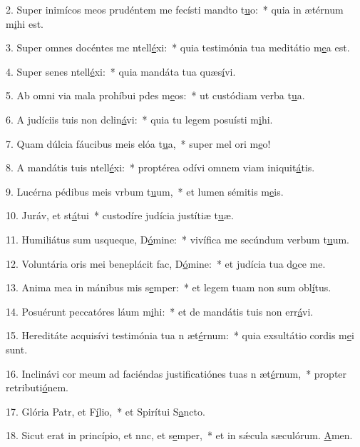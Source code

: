 2. Super inimícos meos prudéntem me fecísti mandto t\uline{u}o:~* quia in ætérnum m\uline{i}hi est.\par 
3. Super omnes docéntes me ntell\uline{é}xi:~* quia testimónia tua meditátio m\uline{e}a est.\par 
4. Super senes ntell\uline{é}xi:~* quia mandáta tua quæs\uline{í}vi.\par 
5. Ab omni via mala prohíbui pdes m\uline{e}os:~* ut custódiam verba t\uline{u}a.\par 
6. A judíciis tuis non dclin\uline{á}vi:~* quia tu legem posuísti m\uline{i}hi.\par 
7. Quam dúlcia fáucibus meis elóa t\uline{u}a,~* super mel ori m\uline{e}o!\par 
8. A mandátis tuis ntell\uline{é}xi:~* proptérea odívi omnem viam iniquit\uline{á}tis.\par 
9. Lucérna pédibus meis vrbum t\uline{u}um,~* et lumen sémitis m\uline{e}is.\par 
10. Juráv, et st\uline{á}tui~* custodíre judícia justítiæ t\uline{u}æ.\par 
11. Humiliátus sum usqueque, D\uline{ó}mine:~* vivífica me secúndum verbum t\uline{u}um.\par 
12. Voluntária oris mei beneplácit fac, D\uline{ó}mine:~* et judícia tua d\uline{o}ce me.\par 
13. Anima mea in mánibus mis s\uline{e}mper:~* et legem tuam non sum obl\uline{í}tus.\par 
14. Posuérunt peccatóres láum m\uline{i}hi:~* et de mandátis tuis non err\uline{á}vi.\par 
15. Hereditáte acquisívi testimónia tua n æt\uline{é}rnum:~* quia exsultátio cordis m\uline{e}i sunt.\par 
16. Inclinávi cor meum ad faciéndas justificatiónes tuas n æt\uline{é}rnum,~* propter retributi\uline{ó}nem.\par 
17. Glória Patr, et F\uline{í}lio,~* et Spirítui S\uline{a}ncto.\par 
18. Sicut erat in princípio, et nnc, et s\uline{e}mper,~* et in sǽcula sæculórum. \uline{A}men.\par 
